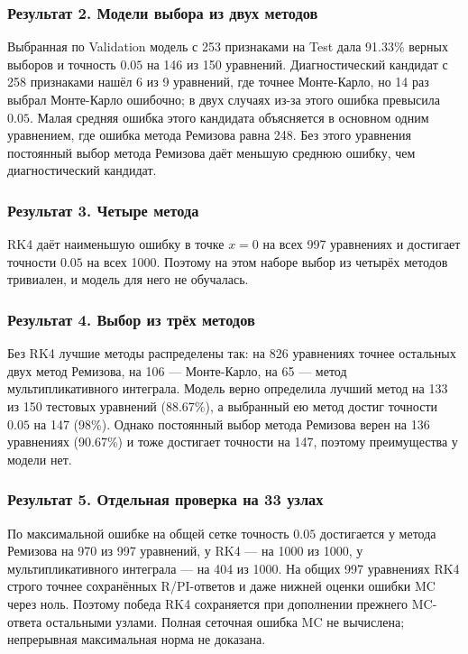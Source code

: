 \documentclass[14pt,a4paper]{extarticle}
\begin{document}
\subsubsection*{Результат 2. Модели выбора из двух методов}
Выбранная по Validation модель с 253 признаками на Test дала
91.33\% верных выборов и точность $0.05$ на 146 из 150 уравнений.
Диагностический кандидат с 258 признаками нашёл 6 из 9 уравнений, где точнее
Монте-Карло, но 14 раз выбрал Монте-Карло ошибочно; в двух случаях
из-за этого ошибка превысила $0.05$. Малая средняя ошибка этого кандидата
объясняется в основном одним уравнением, где ошибка метода Ремизова
равна 248. Без этого уравнения постоянный выбор метода Ремизова даёт
меньшую среднюю ошибку, чем диагностический кандидат.

\subsubsection*{Результат 3. Четыре метода}
RK4 даёт наименьшую ошибку в точке $x=0$ на всех 997 уравнениях
и достигает точности $0.05$ на всех 1000. Поэтому на этом наборе выбор
из четырёх методов тривиален, и модель для него не обучалась.

\subsubsection*{Результат 4. Выбор из трёх методов}
Без RK4 лучшие методы распределены так: на 826 уравнениях точнее
остальных двух метод Ремизова, на 106 --- Монте-Карло, на 65 --- метод
мультипликативного интеграла. Модель верно определила лучший метод на 133 из 150
тестовых уравнений (88.67\%), а выбранный ею метод достиг точности $0.05$
на 147 (98\%). Однако постоянный выбор метода Ремизова верен на 136
уравнениях (90.67\%) и тоже достигает точности на 147, поэтому
преимущества у модели нет.

\subsubsection*{Результат 5. Отдельная проверка на 33 узлах}
По максимальной ошибке на общей сетке точность $0.05$ достигается
у метода Ремизова на 970 из 997 уравнений, у RK4 --- на 1000 из 1000,
у мультипликативного интеграла --- на 404 из 1000. На общих 997
уравнениях RK4 строго точнее сохранённых R/PI-ответов и даже нижней
оценки ошибки MC через ноль. Поэтому победа RK4 сохраняется при
дополнении прежнего MC-ответа остальными узлами. Полная сеточная
ошибка MC не вычислена; непрерывная максимальная норма не доказана.
\end{document}
